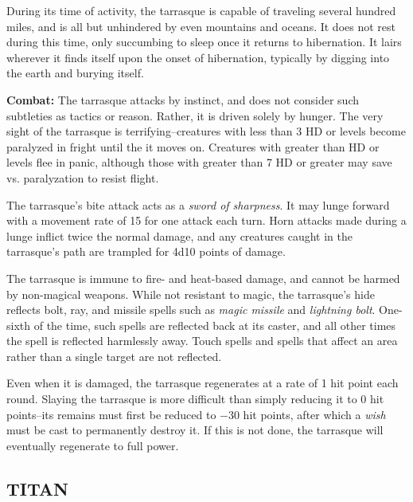 \begin{multicols}{2}
During its time of activity, the tarrasque is capable of traveling several hundred miles, and is all but unhindered by even mountains and oceans. It does not rest during this time, only succumbing to sleep once it returns to hibernation. It lairs wherever it finds itself upon the onset of hibernation, typically by digging into the earth and burying itself.

\textbf{Combat:} The tarrasque attacks by instinct, and does not consider such subtleties as tactics or reason. Rather, it is driven solely by hunger. The very sight of the tarrasque is terrifying--creatures with less than 3 HD or levels become paralyzed in fright until the it moves on. Creatures with greater than HD or levels flee in panic, although those with greater than 7 HD or greater may save vs. paralyzation to resist flight.

The tarrasque's bite attack acts as a \textit{sword of sharpness}. It may lunge forward with a movement rate of 15 for one attack each turn. Horn attacks made during a lunge inflict twice the normal damage, and any creatures caught in the tarrasque's path are trampled for 4d10 points of damage.

The tarrasque is immune to fire- and heat-based damage, and cannot be harmed by non-magical weapons. While not resistant to magic, the tarrasque's hide reflects bolt, ray, and missile spells such as \textit{magic missile} and \textit{lightning bolt}. One-sixth of the time, such spells are reflected back at its caster, and all other times the spell is reflected harmlessly away. Touch spells and spells that affect an area rather than a single target are not reflected.

Even when it is damaged, the tarrasque regenerates at a rate of 1 hit point each round. Slaying the tarrasque is more difficult than simply reducing it to 0 hit points--its remains must first be reduced to $-30$ hit points, after which a \textit{wish} must be cast to permanently destroy it. If this is not done, the tarrasque will eventually regenerate to full power. 

\noindent
\begin{minipage}{\columnwidth}

\vspace{1em}

\subsection{TITAN}


\end{minipage}
\end{multicols}
